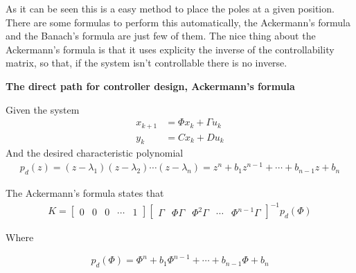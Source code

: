 \documentclass[nols]{tufte-handout}
\theoremstyle{definition}
\begin{document}
\vspace{1cm}
As it can be seen this is a easy method to place the poles at a given position. There are some formulas to perform this automatically, the Ackermann's formula and the Banach's formula are just few of them. The nice thing about the Ackermann's formula is that it uses explicity the inverse of the controllability matrix, so that, if the system isn't controllable there is no inverse.

\noindent\textbf{The direct path for controller design, Ackermann's formula}

Given the system
\begin{align*}
x_{k+1}&=\Phi x_{k}+\Gamma u_{k}\\
y_{k}&=Cx_{k}+Du_{k}%
\end{align*}
And the desired characteristic polynomial
\begin{align*}
p_{d}(z)=(z-\lambda_{1})(z-\lambda_{2})\cdots(z-\lambda_{n})=z^{n}%
+b_{1}z^{n-1}+\cdots+b_{n-1}z+b_{n}%
\end{align*}


The Ackermann's formula states that
\begin{align*}
K=
\begin{bmatrix}
0 & 0 & 0 & \cdots & 1
\end{bmatrix}
\begin{bmatrix}
\Gamma & \Phi\Gamma & \Phi^{2}\Gamma & \cdots & \Phi^{n-1}\Gamma%
\end{bmatrix}
^{-1}p_{d}\left( \Phi \right)
\end{align*}

Where

\[
p_{d}\left( \Phi\right)  =\Phi^{n}+b_{1}\Phi^{n-1}+\cdots+b_{n-1}\Phi+b_{n}%
\]
\end{document}
